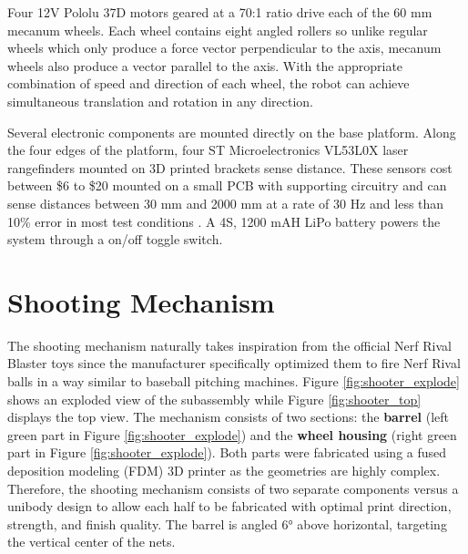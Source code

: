 Four 12V Pololu 37D motors geared at a 70:1 ratio drive each of the 60 mm mecanum wheels. Each wheel contains eight angled rollers so unlike regular wheels which only produce a force vector perpendicular to the axis, mecanum wheels also produce a vector parallel to the axis. With the appropriate combination of speed and direction of each wheel, the robot can achieve simultaneous translation and rotation in any direction. 

Several electronic components are mounted directly on the base platform. Along the four edges of the platform, four ST Microelectronics VL53L0X laser rangefinders mounted on 3D printed brackets sense distance. These sensors cost between \$6 to \$20 mounted on a small PCB with supporting circuitry and can sense distances between 30 mm and 2000 mm at a rate of 30 Hz and less than 10\% error in most test conditions \cite{vl53l0x_datasheet}. A 4S, 1200 mAH LiPo battery powers the system through a on/off toggle switch. 

\section{Shooting Mechanism}
The shooting mechanism naturally takes inspiration from the official Nerf Rival Blaster toys since the manufacturer specifically optimized them to fire Nerf Rival balls in a way similar to baseball pitching machines. Figure \ref{fig:shooter_explode} shows an exploded view of the subassembly while Figure \ref{fig:shooter_top} displays the top view. The mechanism consists of two sections: the \textbf{barrel} (left green part in Figure \ref{fig:shooter_explode}) and the \textbf{wheel housing} (right green part in Figure \ref{fig:shooter_explode}). Both parts were fabricated using a fused deposition modeling (FDM) 3D printer as the geometries are highly complex. Therefore, the shooting mechanism consists of two separate components versus a unibody design to allow each half to be fabricated with optimal print direction, strength, and finish quality. The barrel is angled \ang{6} above horizontal, targeting the vertical center of the nets.

